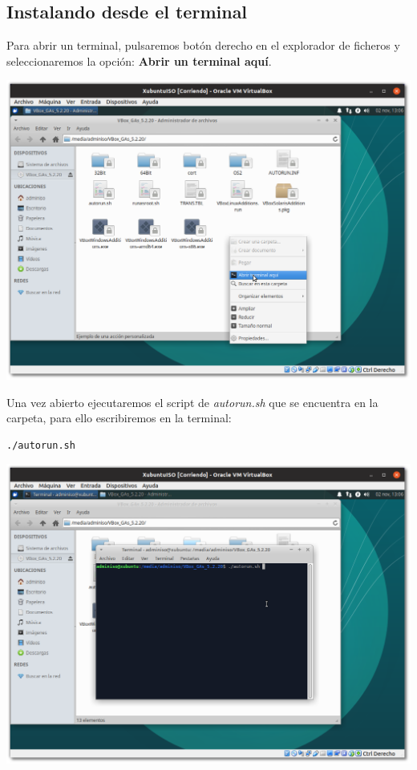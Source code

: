\documentclass[11pt]{article}
\begin{document}
\subsection{Instalando desde el terminal}
\label{sec:orgf67f2a0}
Para abrir un terminal, pulsaremos botón derecho en el explorador de
ficheros y seleccionaremos la opción: \textbf{Abrir un terminal aquí}.

\begin{center}
\includegraphics[width=.9\linewidth]{imgs/VBox_GuestAdd_LinuX_016.png}
\end{center}

Una vez abierto ejecutaremos el script de \emph{autorun.sh} que se encuentra
en la carpeta, para ello escribiremos en la terminal:

\begin{verbatim}
./autorun.sh
\end{verbatim}

\begin{center}
\includegraphics[width=.9\linewidth]{imgs/VBox_GuestAdd_LinuX_017.png}
\end{center}
\end{document}
